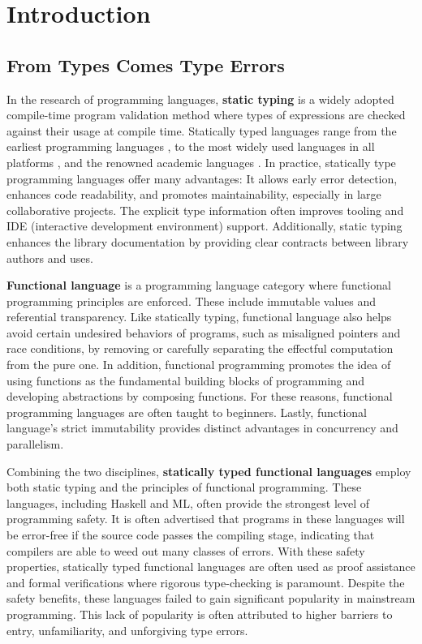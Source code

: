 
\chapter{Introduction}

\label{intro} 

\graphicspath{{Figures/Introduction}}

\section{From Types Comes Type Errors}

In the research of programming languages, \textbf{static typing} is a widely adopted compile-time program validation method where types of expressions are checked against their usage at compile time. Statically typed languages range from the earliest programming languages \cite{Backus1978-xt}, to the most widely used languages in all platforms \cite{Ritchie1978-pa}, and the renowned academic languages \cite{Hudak2007-kn}. In practice, statically type programming languages offer many advantages: It allows early error detection, enhances code readability, and promotes maintainability, especially in large collaborative projects. The explicit type information often improves tooling and IDE (interactive development environment) support. Additionally, static typing enhances the library documentation by providing clear contracts between library authors and uses.

\textbf{Functional language} is a programming language category where functional programming principles are enforced. These include immutable values and referential transparency. Like statically typing, functional language also helps avoid certain undesired behaviors of programs, such as misaligned pointers and race conditions, by removing or carefully separating the effectful computation from the pure one. In addition, functional programming promotes the idea of using functions as the fundamental building blocks of programming and developing abstractions by composing functions. For these reasons, functional programming languages are often taught to beginners. Lastly, functional language's strict immutability provides distinct advantages in concurrency and parallelism.

Combining the two disciplines, \textbf{statically typed functional languages} employ both static typing and the principles of functional programming. These languages, including Haskell and ML, often provide the strongest level of programming safety. It is often advertised that programs in these languages will be error-free if the source code passes the compiling stage, indicating that compilers are able to weed out many classes of errors. With these safety properties, statically typed functional languages are often used as proof assistance and formal verifications where rigorous type-checking is paramount. Despite the safety benefits, these languages failed to gain significant popularity in mainstream programming. This lack of popularity is often attributed to higher barriers to entry, unfamiliarity, and unforgiving type errors.

